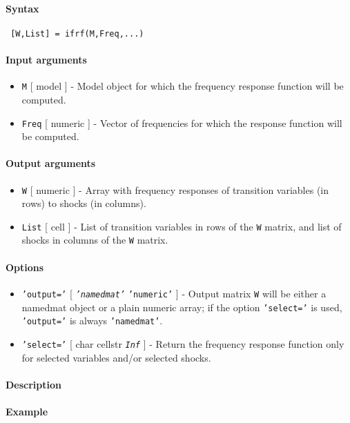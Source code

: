 


	\paragraph{Syntax}
 
 \begin{verbatim}
 [W,List] = ifrf(M,Freq,...)
 \end{verbatim}
 
 \paragraph{Input arguments}
 
 \begin{itemize}
 \item
   \texttt{M} {[} model {]} - Model object for which the frequency
   response function will be computed.
 \item
   \texttt{Freq} {[} numeric {]} - Vector of frequencies for which the
   response function will be computed.
 \end{itemize}
 
 \paragraph{Output arguments}
 
 \begin{itemize}
 \item
   \texttt{W} {[} numeric {]} - Array with frequency responses of
   transition variables (in rows) to shocks (in columns).
 \item
   \texttt{List} {[} cell {]} - List of transition variables in rows of
   the \texttt{W} matrix, and list of shocks in columns of the \texttt{W}
   matrix.
 \end{itemize}
 
 \paragraph{Options}
 
 \begin{itemize}
 \item
   \texttt{'output='} {[} \emph{\texttt{'namedmat'}} \textbar{}
   \texttt{'numeric'} {]} - Output matrix \texttt{W} will be either a
   namedmat object or a plain numeric array; if the option
   \texttt{'select='} is used, \texttt{'output='} is always
   \texttt{'namedmat'}.
 \item
   \texttt{'select='} {[} char \textbar{} cellstr \textbar{}
   \emph{\texttt{Inf}} {]} - Return the frequency response function only
   for selected variables and/or selected shocks.
 \end{itemize}
 
 \paragraph{Description}
 
 \paragraph{Example}


